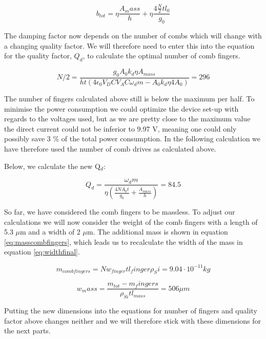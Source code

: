 \documentclass[12pt,a4paper,titlepage]{article}
\begin{document}
\begin{spacing}{1.1}
\begin{equation}
b_{tot} = \eta \dfrac{A_mass}{h} + \eta \dfrac{4 \frac{N}{2} t l_0}{g_0}
\label{eq:dampingwithcomb}
\end{equation}

The damping factor now depends on the number of combs which will change with a changing quality factor. We will therefore need to enter this into the equation for the quality factor, $Q_d$, to calculate the optimal number of comb fingers.

\begin{equation}
N/2 = \dfrac{g_0 A_0 k_d \eta A_{mass}}{ht(4 \epsilon_0 V_DC V_AC \omega_d m - A_0 k_d \eta 4 A_0)} = 296
\label{eq:comfingers2ndit}
\end{equation}

The number of fingers calculated above still is below the maximum per half. To minimise the power consumption we could optimize the device set-up with regards to the voltages used, but as we are pretty close to the maximum value the direct current could not be inferior to 9.97 V, meaning one could only possibly save 3 \% of the total power consumption. In the following calculation we have therefore used the number of comb drives as calculated above.

Below, we calculate the new Q$_d$:

\begin{equation}
Q_d = \dfrac{\omega_d m}{\eta \left(\frac{4N A_0t}{g_0} + \frac{A_{mass}}{h}\right)}= 84.5
\label{eq:qualityfactorit}
\end{equation}

So far, we have considered the comb fingers to be massless. To adjust our calculations we will now consider the weight of the comb fingers with a length of 5.3 $\mu$m and a width of 2 $\mu$m. The additional mass is shown in equation \ref{eq:masscombfingers}, which leads us to recalculate the width of the mass in equation \ref{eq:widthfinal}.

\begin{equation}
m_{comb fingers} = N w_{finger} t l_finger \rho_Si = 9.04 \cdot 10^{-11} kg
\label{eq:masscombfingers}
\end{equation}

\begin{equation}
w_mass = \dfrac{m_{tot} - m_fingers}{\rho_{Si} t l_{mass}} = 506 \mu m
\label{eq:widthfinal}
\end{equation}

Putting the new dimensions into the equations for number of fingers and quality factor above changes neither and we will therefore stick with these dimensions for the next parts.


\end{spacing}
\end{document}
